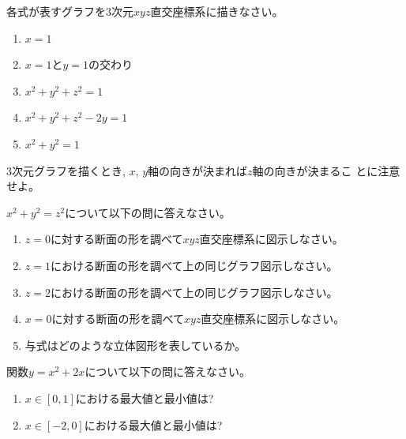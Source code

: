 \documentclass[twocolumn,11pt]{jarticle}
\begin{document}
\nquestion
各式が表すグラフを3次元$xyz$直交座標系に描きなさい。
\begin{enumerate}
\item $x=1$
\item $x=1$と$y=1$の交わり
\item $x^2+y^2+z^2=1$
\item $x^2+y^2+z^2-2y=1$
\item $x^2+y^2=1$
\end{enumerate}

\comment
3次元グラフを描くとき, $x$, $y$軸の向きが決まれば$z$軸の向きが決まるこ
とに注意せよ。

\nquestion
$x^2+y^2=z^2$について以下の問に答えなさい。
\begin{enumerate}
\item $z=0$に対する断面の形を調べて$xyz$直交座標系に図示しなさい。
\item $z=1$における断面の形を調べて上の同じグラフ図示しなさい。
\item $z=2$における断面の形を調べて上の同じグラフ図示しなさい。
\item $x=0$に対する断面の形を調べて$xyz$直交座標系に図示しなさい。
\item 与式はどのような立体図形を表しているか。
\end{enumerate}

\nquestion
関数$y=x^2+2x$について以下の問に答えなさい。
\begin{enumerate}
\item $x\in[0,1]$における最大値と最小値は?
\item $x\in[-2,0]$における最大値と最小値は?
\end{enumerate}


\end{document}

